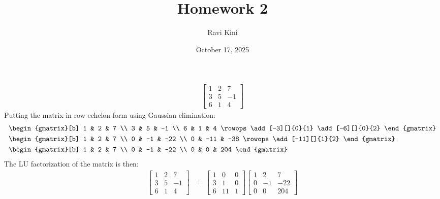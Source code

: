 \documentclass{article}
\title{Homework 2}
\author{Ravi Kini}
\date{October 17, 2025}
\begin{document}
\maketitle

\problem{}
\begin{align*}
    \begin{bmatrix}
        1 & 2 & 7 \\
        3 & 5 & -1 \\
        6 & 1 & 4
    \end{bmatrix}
\end{align*}
Putting the matrix in row echelon form using Gaussian elimination:
\begin{align*}
    & \begin{gmatrix}[b]
        1 & 2 & 7 \\
        3 & 5 & -1 \\
        6 & 1 & 4
    \rowops
    \add[-3][]{0}{1}
    \add[-6][]{0}{2}
    \end{gmatrix}  \\
    & \begin{gmatrix}[b]
        1 & 2 & 7 \\
        0 & -1 & -22 \\
        0 & -11 & -38
    \rowops
    \add[-11][]{1}{2}
    \end{gmatrix}   \\
    & \begin{gmatrix}[b]
        1 & 2 & 7 \\
        0 & -1 & -22 \\
        0 & 0 & 204
    \end{gmatrix} 
\end{align*}
The LU factorization of the matrix is then:
\begin{align*}
    \begin{bmatrix}
        1 & 2 & 7 \\
        3 & 5 & -1 \\
        6 & 1 & 4
    \end{bmatrix}
    & =
    \begin{bmatrix}
        1 & 0 & 0 \\
        3 & 1 & 0 \\
        6 & 11 & 1
    \end{bmatrix}
    \begin{bmatrix}
        1 & 2 & 7 \\
        0 & -1 & -22 \\
        0 & 0 & 204
    \end{bmatrix}
\end{align*}
\end{document}
